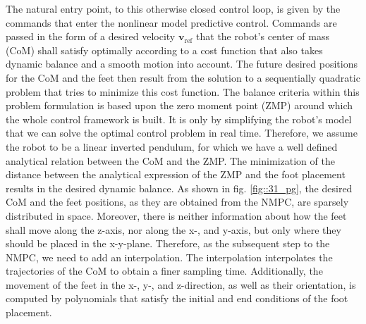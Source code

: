 The natural entry point, to this otherwise closed control loop, is given by the commands that enter the nonlinear model predictive control. Commands are passed in the form of a desired velocity $\mathbf{v}_\text{ref}$ that the robot's center of mass (CoM) shall satisfy optimally according to a cost function that also takes dynamic balance and a smooth motion into account. The future desired positions for the CoM and the feet then result from the solution to a sequentially quadratic problem that tries to minimize this cost function. The balance criteria within this problem formulation is based upon the zero moment point (ZMP) around which the whole control framework is built. It is only by simplifying the robot's model that we can solve the optimal control problem in real time. Therefore, we assume the robot to be a linear inverted pendulum, for which we have a well defined analytical relation between the CoM and the ZMP. The minimization of the distance between the analytical expression of the ZMP and the foot placement results in the desired dynamic balance. As shown in fig. \ref{fig::31_pg}, the desired CoM and the feet positions, as they are obtained from the NMPC, are sparsely distributed in space. Moreover, there is neither information about how the feet shall move along the z-axis, nor along the x-, and y-axis, but only where they should be placed in the x-y-plane. Therefore, as the subsequent step to the NMPC, we need to add an interpolation. The interpolation interpolates the trajectories of the CoM to obtain a finer sampling time. Additionally, the movement of the feet in the x-, y-, and z-direction, as well as their orientation, is computed by polynomials that satisfy the initial and end conditions of the foot placement. 


 